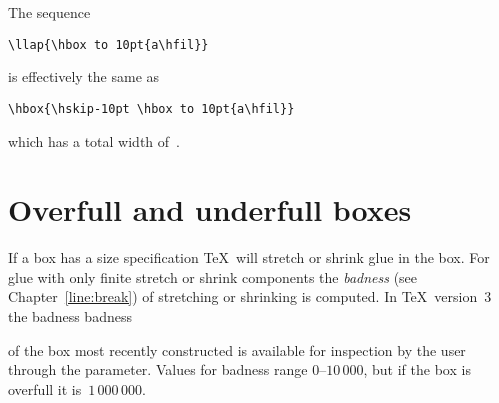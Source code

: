 \documentclass{book}
\begin{document}
\begin{example} The sequence
\begin{verbatim}
\llap{\hbox to 10pt{a\hfil}}
\end{verbatim}
is effectively the same as
\begin{verbatim}
\hbox{\hskip-10pt \hbox to 10pt{a\hfil}}
\end{verbatim}
which has a total width of~\n{0pt}.
\end{example}

\section{Overfull and underfull boxes}
\label{over/underfull}

If a box has a  size specification \TeX\ will
stretch or shrink glue in the box. For glue with
only finite stretch or shrink components the {\em badness\/}
(see Chapter~\ref{line:break}) of stretching or shrinking
is computed.
In \TeX\ version~3 the badness
\cstoidx badness\par
{}
of the box most recently
constructed is available for inspection
by the user through the  parameter. Values for
badness range 0--$10\,000$, but if the box is overfull
it is~$1\,000\,000$.
\end{document}
